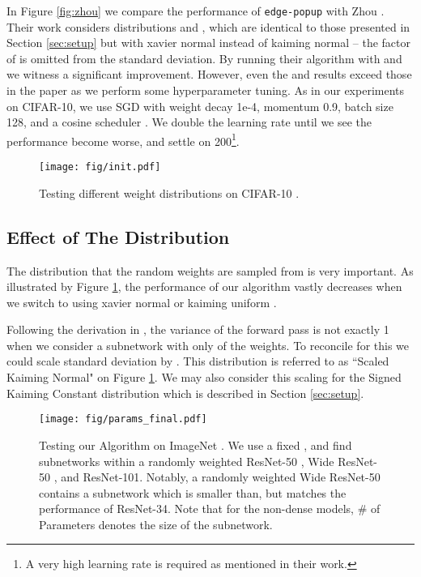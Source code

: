 \documentclass[10pt,twocolumn,letterpaper]{article}
\newcommand{\alg}{\texttt{edge-popup} }
\begin{document}
In Figure \ref{fig:zhou} we compare the performance of \alg with Zhou \etal. Their work considers distributions  and , which are identical to those presented in Section \ref{sec:setup} but with xavier normal \cite{glorot} instead of kaiming normal \cite{kaiming-init} -- the factor of  is omitted from the standard deviation. By running their algorithm with  and  we witness a significant improvement. However, even the  and  results exceed those in the paper as we perform some hyperparameter tuning. As in our experiments on CIFAR-10, we use SGD with weight decay 1e-4, momentum 0.9, batch size 128, and a cosine scheduler \cite{cosinelr}. We double the learning rate until we see the performance become worse, and settle on 200\footnote{A very high learning rate is required as mentioned in their work.}.

\begin{figure}[h]
    \centering
    \texttt{[image: fig/init.pdf]}
    \caption{Testing different weight distributions on CIFAR-10 \cite{cifar}.}
    \label{fig:init}
\end{figure}

\subsection{Effect of The Distribution} \label{sec:init}

The distribution that the random weights are sampled from is very important. As illustrated by Figure \ref{fig:init}, the performance of our algorithm vastly decreases when we switch to using xavier normal \cite{glorot} or kaiming uniform \cite{kaiming-init}.

Following the derivation in \cite{kaiming-init}, the variance of the forward pass is not exactly 1 when we consider a subnetwork with only  of the weights. To reconcile for this we could scale standard deviation by . This distribution is referred to as ``Scaled Kaiming Normal" on Figure \ref{fig:init}. We may also consider this scaling for the Signed Kaiming Constant distribution which is described in Section \ref{sec:setup}.

\begin{figure}[h]
\begin{center}
\texttt{[image: fig/params\_final.pdf]}
  
\end{center}
  \caption{Testing our Algorithm on ImageNet \cite{imagenet}. We use a fixed , and find subnetworks within a randomly weighted ResNet-50 \cite{resnet}, Wide ResNet-50 \cite{wideresnet}, and ResNet-101. Notably, a randomly weighted Wide ResNet-50 contains a subnetwork which is smaller than, but matches the performance of ResNet-34. Note that for the non-dense models, \# of Parameters denotes the size of the subnetwork.}
\label{fig:params}
\end{figure}
\end{document}
